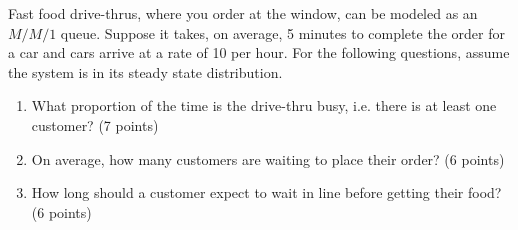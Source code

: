 
\item Fast food drive-thrus, where you order at the window, can be modeled as 
an $M/M/1$ queue. 
Suppose it takes, on average, 5 minutes to complete the order for a car and 
cars arrive at a rate of 10 per hour. 
For the following questions, assume the system is in its steady state 
distribution.

\begin{enumerate}
\item What proportion of the time is the drive-thru busy, i.e. there is at least
one customer? (7 points)

\vfill


\item On average, how many customers are waiting to place their order? (6 points)

\vfill

\item How long should a customer expect to wait in line before getting their 
food? (6 points)

\vfill

\end{enumerate}